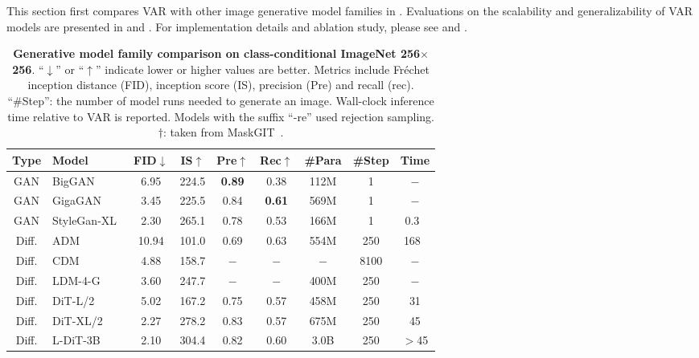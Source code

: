 This section first compares VAR with other image generative model families in .
Evaluations on the scalability and generalizability of VAR models are presented in  and .
For implementation details and ablation study, please see  and .

\begin{table}[!th]
\renewcommand\arraystretch{1.05}
\centering
\setlength{\tabcolsep}{2.5mm}{}
\small
{
\caption{\smallcaption
\textbf{Generative model family comparison on class-conditional ImageNet 256$\times$256}.
``$\downarrow$'' or ``$\uparrow$'' indicate lower or higher values are better.
Metrics include Fréchet inception distance (FID), inception score (IS), precision (Pre) and recall (rec).
``\#Step'': the number of model runs needed to generate an image.
Wall-clock inference time relative to VAR is reported.
Models with the suffix ``-re'' used rejection sampling.
$\dag$: taken from MaskGIT~\cite{maskgit}.
}\label{tab:main}
\vspace{-2pt}
\scalebox{0.98}
{
\begin{tabular}{c|l|cc|cc|cc|c}
\toprule
Type & Model          & FID$\downarrow$ & IS$\uparrow$ & Pre$\uparrow$ & Rec$\uparrow$ & \#Para & \#Step & Time \\
\midrule
GAN   & BigGAN~\cite{biggan}  & 6.95  & 224.5       & \textbf{0.89} & 0.38 & 112M & 1    & $-$    \\
GAN   & GigaGAN~\cite{gigagan}     & 3.45  & 225.5       & 0.84 & \textbf{0.61} & 569M & 1    & $-$ \\
GAN   & StyleGan-XL~\cite{stylegan-xl}  & 2.30  & 265.1       & 0.78 & 0.53 & 166M & 1    & 0.3~\cite{stylegan-xl}   \\
\midrule
Diff. & ADM~\cite{adm}         & 10.94 & 101.0        & 0.69 & 0.63 & 554M & 250  & 168~\cite{stylegan-xl}   \\
Diff. & CDM~\cite{cdm}         & 4.88  & 158.7       & $-$  & $-$  & $-$  & 8100 & $-$    \\
Diff. & LDM-4-G~\cite{ldm}     & 3.60  & 247.7       & $-$  & $-$  & 400M & 250  & $-$    \\
Diff. & DiT-L/2~\cite{dit}     & 5.02  & 167.2       & 0.75 & 0.57 & 458M & 250  & 31     \\
Diff. & DiT-XL/2~\cite{dit}    & 2.27  & 278.2       & 0.83 & 0.57 & 675M & 250  & 45     \\
Diff. & L-DiT-3B~\cite{dit-github}    & 2.10  & 304.4       & 0.82 & 0.60 & 3.0B & 250  & $>$45     \\

\end{tabular}}}
\end{table}
